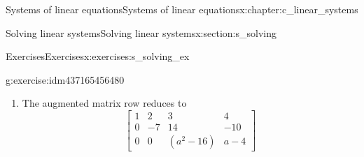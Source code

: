 \documentclass[oneside,10pt,]{book}
\newcommand{\lititle}[1]{{\slshape#1}}
\numberwithin{equation}{section}
\newcommand{\amp}{&}
\begin{document}
\begin{chapterptx}{Systems of linear equations}{}{Systems of linear equations}{}{}{x:chapter:c_linear_systems}
\begin{sectionptx}{Solving linear systems}{}{Solving linear systems}{}{}{x:section:s_solving}
\begin{exercises-subsection-numberless}{Exercises}{}{Exercises}{}{}{x:exercises:s_solving_ex}
\begin{divisionexercise}{6}{}{}{g:exercise:idm437165456480}
\begin{enumerate}[marker=(\alph*)]
\begin{align*}
\begin{bmatrix}1\amp 2\amp 1\amp 2\\ 2\amp -2\amp 3\amp 1\\ 1\amp 2\amp 3-a^2\amp a \end{bmatrix} \amp \xrightarrow[]{r_1 - r_3} \begin{bmatrix}1\amp 2\amp 1\amp 2\\ 2\amp -2\amp 3\amp 1\\ 0\amp 0\amp a^2-2\amp 2-a \end{bmatrix}\\
\amp \xrightarrow[]{2r_1 - r_2} \begin{bmatrix}1\amp 2\amp 1\amp 2\\ 0\amp 6\amp -1\amp 3\\ 0\amp 0\amp a^2-2\amp 2-a \end{bmatrix}\\
\amp \xrightarrow[]{\frac{1}{6}r_2} \begin{bmatrix}1\amp 2\amp 1\amp 2\\ 0\amp 1\amp -\frac{1}{6}\amp \frac{1}{2}\\ 0\amp 0\amp a^2-2\amp 2-a \end{bmatrix}
\end{align*}
The row echelon form, and thus the set of solutions, now depends on whether \(a^2-2=0\) or not: equivalently, whether \(a=\pm\sqrt{2}\) or not. This gives us two cases:%
%
\begin{itemize}[marker=\textbullet]
\item{}\lititle{Case: \(a=\pm \sqrt{2}\).}\par%
In this case \(2-a\ne 0\), which means the row echelon matrix will end up having a leading 1 in the last column, resulting in an inconsistent system. There are no solutions in this case.%
\item{}\lititle{Case: \(a\ne \pm\sqrt{2}\).}\par%
In this case the third column of the row echelon form will have a leading 1, and all variables are leading variables. Thus there is a unique solution in this case, obtained by back substitution.%
\par
Since our two cases above are exhaustive, we see that there is no choice of \(a\) that yields infinitely many solutions in this case%
\end{itemize}
\item{}The augmented matrix row reduces to%
\begin{equation*}
\begin{bmatrix}1\amp 2\amp 3\amp 4\\ 0\amp -7\amp 14\amp -10\\ 0\amp 0\amp (a^2-16)\amp a-4 \end{bmatrix}

\end{equation*}
\end{enumerate}
\end{divisionexercise}
\end{exercises-subsection-numberless}
\end{sectionptx}
\end{chapterptx}
\end{document}
